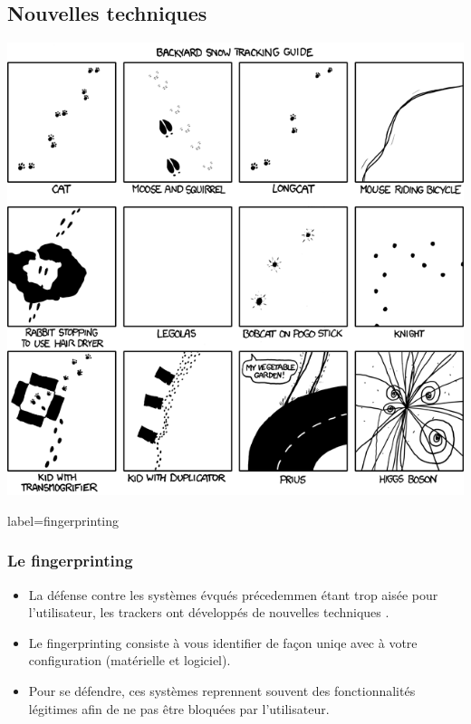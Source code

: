 \documentclass{beamer}
\begin{document}
    \subsection{Nouvelles techniques}
        \begin{frame}
            \begin{center}
                \includegraphics[scale=0.35]{img/snow_tracking.png}
            \end{center}
        \end{frame}
        \begin{frame}{label=fingerprinting}
            \frametitle{Le fingerprinting}
            \begin{center}
                \begin{itemize}
                    \item La défense contre les systèmes évqués précedemmen étant trop aisée pour l'utilisateur, les trackers ont développés de nouvelles techniques \cite{web}.
                    \item Le fingerprinting consiste à vous identifier de façon uniqe avec à votre configuration (matérielle et logiciel).
                    \item Pour se défendre, ces systèmes reprennent souvent des fonctionnalités légitimes afin de ne pas être bloquées par l'utilisateur.
                \end{itemize}
            \end{center}
        \end{frame}
\end{document}
